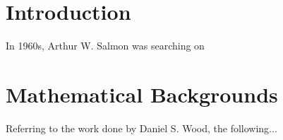 \documentclass[options]{vlsithesis}
\begin{document}
\tableofcontents
\listoffigures
\listoftables





\chapter{Introduction}

In 1960s, Arthur W. Salmon was searching on 



\chapter{Mathematical Backgrounds}

Referring to the work done by Daniel S. Wood, the following...
\end{document}
